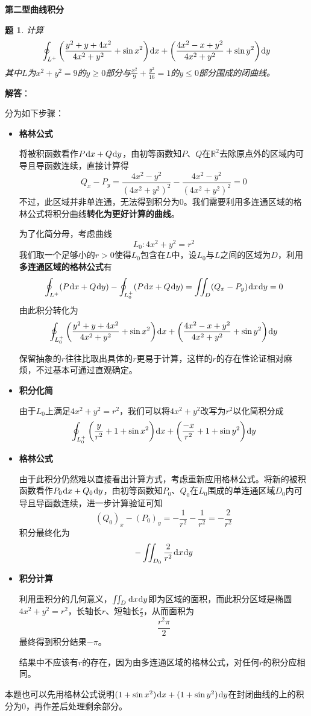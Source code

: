 \documentclass[a4paper,UTF8,fontset=windows,AutoFakeBold]{ctexart}
\newcommand*{\dr}{\hspace{0.07em}\mathrm{d}}
\newcommand*{\rb}{\mathbb{R}}
\newcommand*{\note}{\noindent *}
\theoremstyle{ex}
\newtheorem{exercise}{题}
\newcommand{\sol}[1]{{\vspace{5pt}\kaishu\noindent\textbf{解答}：\vspace{-3pt}
\begin{compactitem}
    \item[] #1
\end{compactitem}
}}
\begin{document}
\noindent\textbf{第二型曲线积分}
\begin{framed}
\begin{exercise}\label{green out}
    计算
    $$\oint_{L^+}\bigg(\frac{y^2+y+4x^2}{4x^2+y^2}+\sin x^2\bigg)\dr x+\bigg(\frac{4x^2-x+y^2}{4x^2+y^2}+\sin y^2\bigg)\dr y$$
    其中$L$为$x^2+y^2=9$的$y\ge0$部分与$\frac{x^2}{9}+\frac{y^2}{16}=1$的$y\le0$部分围成的闭曲线。
\end{exercise}
\sol{
    分为如下步骤：
    \begin{itemize}
        \item \textbf{格林公式}
        
        将被积函数看作$P\dr x+Q\dr y$，由初等函数知$P$、$Q$在$\rb^2$去除原点外的区域内可导且导函数连续，直接计算得
        $$Q_x-P_y=\frac{4x^2-y^2}{(4x^2+y^2)^2}-\frac{4x^2-y^2}{(4x^2+y^2)^2}=0$$
        不过，此区域并非单连通，无法得到积分为0。我们需要利用多连通区域的格林公式将积分曲线\textbf{转化为更好计算的曲线}。

        为了化简分母，考虑曲线
        $$L_0\colon4x^2+y^2=r^2$$
        我们取一个足够小的$r>0$使得$L_0$包含在$L$中，设$L_0$与$L$之间的区域为$D$，利用\textbf{多连通区域的格林公式}有
        $$\oint_{L^+}(P\dr x+Q\dr y)-\oint_{L_0^+}(P\dr x+Q\dr y)=\iint_D(Q_x-P_y)\dr x\dr y=0$$
        由此积分转化为
        $$\oint_{L_0^+}\bigg(\frac{y^2+y+4x^2}{4x^2+y^2}+\sin x^2\bigg)\dr x+\bigg(\frac{4x^2-x+y^2}{4x^2+y^2}+\sin y^2\bigg)\dr y$$

        \note 保留抽象的$r$往往比取出具体的$r$更易于计算，这样的$r$的存在性论证相对麻烦，不过基本可通过直观确定。

        \item \textbf{积分化简}
        
        由于$L_0$上满足$4x^2+y^2=r^2$，我们可以将$4x^2+y^2$改写为$r^2$以化简积分成
        $$\oint_{L_0^+}\bigg(\frac{y}{r^2}+1+\sin x^2\bigg)\dr x+\bigg(\frac{-x}{r^2}+1+\sin y^2\bigg)\dr y$$

        \item \textbf{格林公式}
        
        由于此积分仍然难以直接看出计算方式，考虑重新应用格林公式。将新的被积函数看作$P_0\dr x+Q_0\dr y$，由初等函数知$P_0$、$Q_0$在$L_0$围成的单连通区域$D_0$内可导且导函数连续，进一步计算验证可知
        $$(Q_0)_x-(P_0)_y=-\frac{1}{r^2}-\frac{1}{r^2}=-\frac{2}{r^2}$$
        积分最终化为
        $$-\iint_{D_0}\frac{2}{r^2}\dr x\dr y$$

        \item \textbf{积分计算}

        利用重积分的几何意义，$\iint_D\dr x\dr y$即为区域的面积，而此积分区域是椭圆$4x^2+y^2=r^2$，长轴长$r$、短轴长$\frac{r}{2}$，从而面积为
        $$\frac{r^2\pi}{2}$$
        最终得到积分结果$-\pi$。

        \note 结果中不应该有$r$的存在，因为由多连通区域的格林公式，对任何$r$的积分应相同。
    \end{itemize}

    \note 本题也可以先用格林公式说明$(1+\sin x^2)\dr x+(1+\sin y^2)\dr y$在封闭曲线的上的积分为0，再作差后处理剩余部分。
}
\end{framed}
\end{document}
